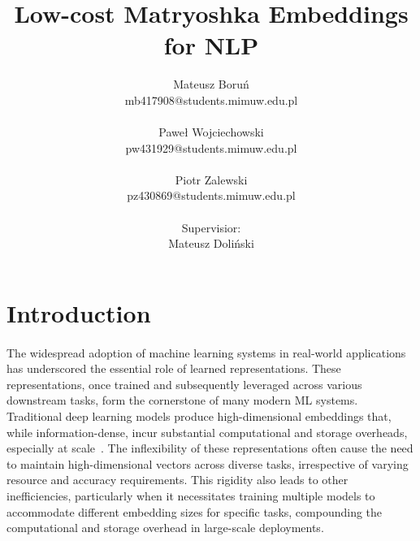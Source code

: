 \documentclass[12pt]{article}
\begin{document}

\title{Low-cost Matryoshka Embeddings for NLP}%
\author{Mateusz Boruń\\ %
    mb417908@students.mimuw.edu.pl\\\\
    Paweł Wojciechowski\\ %
    pw431929@students.mimuw.edu.pl\\\\
    Piotr Zalewski\\ %
    pz430869@students.mimuw.edu.pl\\\\
    Supervisior:\\
    Mateusz Doliński}


\maketitle

\section{Introduction}

\paragraph{}
The widespread adoption of machine learning systems in real-world applications has underscored the essential role of learned representations. These representations, once trained and subsequently leveraged across various downstream tasks, form the cornerstone of many modern ML systems. Traditional deep learning models produce high-dimensional embeddings that, while information-dense, incur substantial computational and storage overheads, especially at scale~\cite{10.1145/1498759.1498761}. The inflexibility of these representations often cause the need to maintain high-dimensional vectors across diverse tasks, irrespective of varying resource and accuracy requirements. This rigidity also leads to other inefficiencies, particularly when it necessitates training multiple models to accommodate different embedding sizes for specific tasks, compounding the computational and storage overhead in large-scale deployments.
\end{document}
